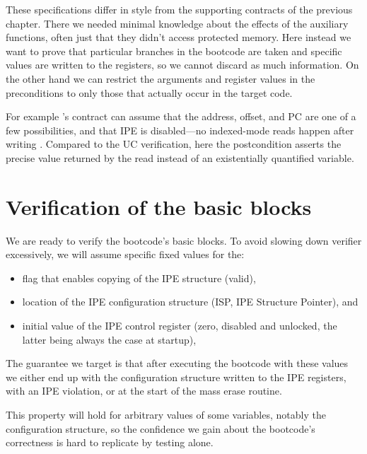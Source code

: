 These specifications differ in style from the supporting contracts of the previous chapter. There we needed minimal knowledge about the effects of the auxiliary functions, often just that they didn't access protected memory. Here instead we want to prove that particular branches in the bootcode are taken and specific values are written to the registers, so we cannot discard as much information. On the other hand we can restrict the arguments and register values in the preconditions to only those that actually occur in the target code.

For example 's contract can assume that the address, offset, and PC are one of a few possibilities, and that IPE is disabled---no indexed-mode reads happen after writing . Compared to the UC verification, here the postcondition asserts the precise value returned by the read instead of an existentially quantified variable.

\section{Verification of the basic blocks}

We are ready to verify the bootcode's basic blocks. To avoid slowing down verifier excessively, we will assume specific fixed values for the:
\begin{itemize}
\item flag that enables copying of the IPE structure (valid),
\item location of the IPE configuration structure (ISP, IPE Structure Pointer), and
\item initial value of the IPE control register  (zero, \ie disabled and unlocked, the latter being always the case at startup),
\end{itemize}


The guarantee we target is that after executing the bootcode with these values we either end up with the configuration structure written to the IPE registers, with an IPE violation, or at the start of the mass erase routine.

This property will hold for arbitrary values of some variables, notably the configuration structure, so the confidence we gain about the bootcode's correctness is hard to replicate by testing alone.




